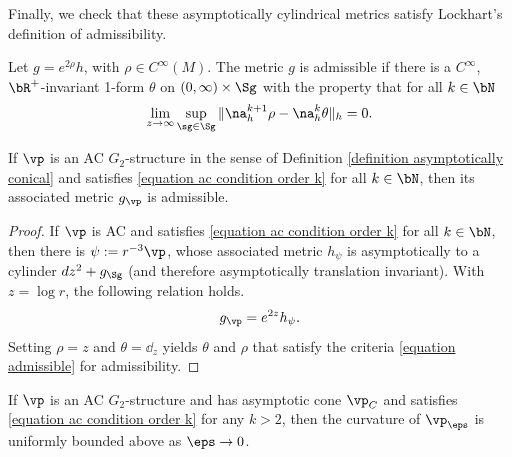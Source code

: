 \documentclass[hidelinks, 12pt, oneside, reqno]{amsart}
\begin{document}
Finally, we check that these asymptotically cylindrical metrics satisfy Lockhart's definition of admissibility.

\begin{defn}\label{definition lockhart admissible}\cite[Definition 2.3]{Lockhart1987}
Let $g =e^{2\rho}h$, with $\rho \in C^{\infty}(M)$. The metric $g$ is admissible if there is a $C^\infty$, $\bR^+$-invariant 1-form $\theta$ on $(0,\infty) \times \Sg$ with the property that for all $k \in \bN$
\begin{equation}\label{equation admissible}
    \lim_{z\rightarrow \infty} \sup_{\sg \in \Sg} \|\na_{h}^{k+1} \rho - \na_{h}^k \theta \|_h = 0.
\end{equation}
\end{defn}

\begin{lem}
If $\vp$ is an AC $G_2$-structure in the sense of Definition \ref{definition asymptotically conical} and satisfies \eqref{equation ac condition order k} for all $k \in \bN$, then its associated metric $g_\vp$ is admissible.
\end{lem}

\begin{proof}
    If $\vp$ is AC and satisfies \eqref{equation ac condition order k} for all $k \in \bN$, then there is $\psi := r^{-3}\vp$, whose associated metric $h_\psi$ is asymptotically to a cylinder $dz^2 + g_\Sg$ (and therefore asymptotically translation invariant). With $z = \log r$, the following relation holds. 
    \[
    g_\vp = e^{2z}h_\psi. 
    \]
    Setting $\rho = z$ and $\theta = \dd_z$ yields $\theta$ and $\rho$ that satisfy the criteria \eqref{equation admissible} for admissibility.
\end{proof}

\begin{prop}\label{proposition uniform C2 convergence of approximations}
   If $\vp$ is an AC $G_2$-structure and has asymptotic cone $\vp_C$ and satisfies \eqref{equation ac condition order k} for any $k > 2$, then the curvature of $\vp_\eps$ is uniformly bounded above as $\eps \rightarrow 0$. 
\end{prop}
\end{document}
